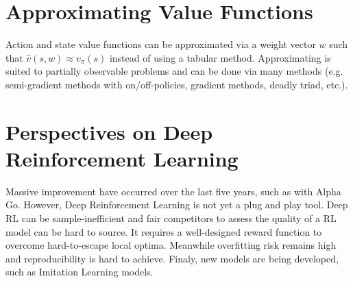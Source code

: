 \documentclass[a4paper, 10pt]{article}
\begin{document}
\section{Approximating Value Functions}
Action and state value functions can be approximated via a weight vector $w$ such that $\hat{v}(s, w)\approx v_\pi(s)$ instead of using a tabular method. Approximating is suited to partially observable problems and can be done via many methods (e.g. semi-gradient methods with on/off-policies, gradient methods, deadly triad, etc.).

\section{Perspectives on Deep Reinforcement Learning}

Massive improvement have occurred over the last five years, such as with Alpha Go. However, Deep Reinforcement Learning is not yet a plug and play tool. Deep RL can be sample-inefficient and fair competitors to assess the quality of a RL model can be hard to source. It requires a well-designed reward function to overcome hard-to-escape local optima. Meanwhile overfitting risk remains high and reproducibility is hard to achieve. Finaly, new models are being developed, such as Imitation Learning models.
\end{document}
